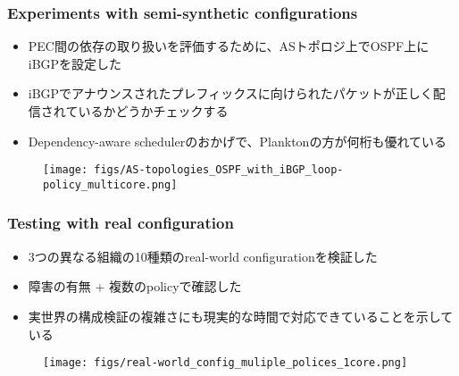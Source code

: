 \documentclass[dvipdfmx,9pt,notheorems]{beamer}
\theoremstyle{definition}
\begin{document}
\begin{frame}\frametitle{Experiments with semi-synthetic configurations}
\begin{itemize}
	\item PEC間の依存の取り扱いを評価するために、ASトポロジ上でOSPF上にiBGPを設定した
	\item iBGPでアナウンスされたプレフィックスに向けられたパケットが正しく配信されているかどうかチェックする
	\item Dependency-aware schedulerのおかげで、Planktonの方が何桁も優れている
\end{itemize}
\begin{figure}[htb]
  \centering
	\texttt{[image: figs/AS-topologies\_OSPF\_with\_iBGP\_loop-policy\_multicore.png]}
\end{figure}%
\end{frame}

\begin{frame}\frametitle{Testing with real configuration}
\begin{itemize}
	\item 3つの異なる組織の10種類のreal-world configurationを検証した
	\item 障害の有無 + 複数のpolicyで確認した
	\item 実世界の構成検証の複雑さにも現実的な時間で対応できていることを示している
\end{itemize}
\begin{figure}[htb]
  \centering
	\texttt{[image: figs/real-world\_config\_muliple\_polices\_1core.png]}
\end{figure}%
\end{frame}
\end{document}
